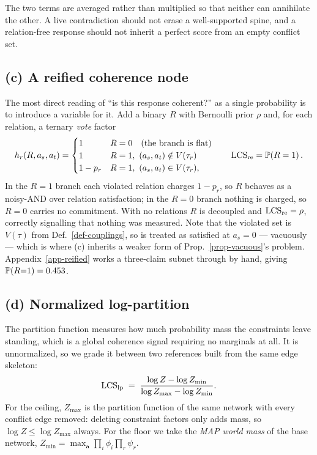 The two terms are averaged rather than multiplied so that neither can annihilate the other. A live
contradiction should not erase a well-supported spine, and a relation-free response should not
inherit a perfect score from an empty conflict set.

\subsection{(c) A reified coherence node}
\label{sec-reified}

The most direct reading of ``is this response coherent?'' as a single probability is to introduce a
variable for it. Add a binary $R$ with Bernoulli prior $\rho$ and, for each relation, a ternary
\emph{vote} factor
\begin{equation}
h_r(R,a_s,a_t)=\begin{cases}
1 & R=0 \quad\text{(the branch is flat)}\\
1 & R=1,\ (a_s,a_t)\notin V(\tau_r)\\
1-p_r & R=1,\ (a_s,a_t)\in V(\tau_r),
\end{cases}
\qquad \mathrm{LCS}_{\mathrm{re}}=\mathbb{P}\!\left( R=1 \right).
\label{eq-reified}
\end{equation}
In the $R=1$ branch each violated relation charges $1-p_r$, so $R$ behaves as a noisy-AND over
relation satisfaction; in the $R=0$ branch nothing is charged, so $R=0$ carries no commitment. With
no relations $R$ is decoupled and $\mathrm{LCS}_{\mathrm{re}}=\rho$, correctly signalling that nothing was measured.
Note that the violated set is $V(\tau)$ from Def.~\ref{def-couplings}, so \ent{} is treated as
satisfied at $a_s=0$ --- vacuously --- which is where (c) inherits a weaker form of
Prop.~\ref{prop-vacuous}'s problem. Appendix~\ref{app-reified} works a three-claim subnet through by
hand, giving $\mathbb{P}\!\left( R{=}1 \right)=0.453$.

\subsection{(d) Normalized log-partition}
\label{sec-logz}

The partition function measures how much probability mass the constraints leave standing, which is a
global coherence signal requiring no marginals at all. It is unnormalized, so we grade it between two
references built from the same edge skeleton:
\begin{equation}
\mathrm{LCS}_{\mathrm{lp}} \;=\; \frac{\log Z - \log Z_{\min}}{\log Z_{\max} - \log Z_{\min}} .
\label{eq-logz}
\end{equation}
For the ceiling, $Z_{\max}$ is the partition function of the same network with every conflict edge
removed: deleting constraint factors only adds mass, so $\log Z\le\log Z_{\max}$ always. For the
floor we take the \emph{MAP world mass} of the base network,
$Z_{\min}=\max_{\mathbf{a}}\prod_i\phi_i\prod_r\psi_r$.

